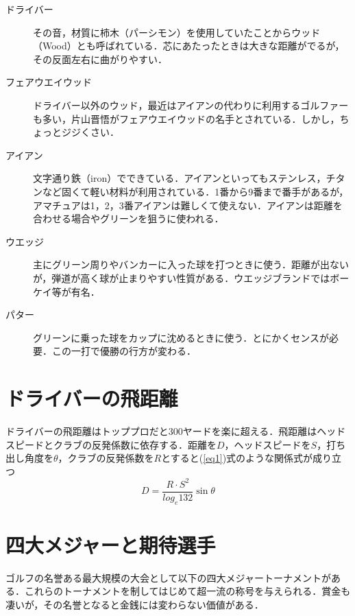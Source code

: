 \documentclass[a4j, twocolumn]{jarticle}
\begin{document}
\begin{description}
    \item[ドライバー]
    その音，材質に柿木（パーシモン）を使用していたことからウッド（Wood）とも呼ばれている．芯にあたったときは大きな距離がでるが，その反面左右に曲がりやすい．

    \item[フェアウエイウッド]
    ドライバー以外のウッド，最近はアイアンの代わりに利用するゴルファーも多い，片山晋悟がフェアウエイウッドの名手とされている．しかし，ちょっとジジくさい．

    \item[アイアン]
    文字通り鉄（iron）でできている．アイアンといってもステンレス，チタンなど固くて軽い材料が利用されている．1番から9番まで番手があるが，アマチュアは1，2，3番アイアンは難しくて使えない．アイアンは距離を合わせる場合やグリーンを狙うに使われる．

    \item[ウエッジ]
    主にグリーン周りやバンカーに入った球を打つときに使う．距離が出ないが，弾道が高く球が止まりやすい性質がある．ウエッジブランドではボーケイ等が有名．

    \item[パター]
    グリーンに乗った球をカップに沈めるときに使う．とにかくセンスが必要．この一打で優勝の行方が変わる．
\end{description}


\section{ドライバーの飛距離}

ドライバーの飛距離はトッププロだと300ヤードを楽に超える．飛距離はヘッドスピードとクラブの反発係数に依存する．距離を$D$，ヘッドスピードを$S$，打ち出し角度を$\theta$，クラブの反発係数を$R$とすると(\ref{eq1})式のような関係式が成り立つ~\cite{bib2}\\

\begin{equation}
    \label{eq1}
    D = \frac{R \cdot S^2}{log_e 132}\sin\theta
\end{equation}


\section{四大メジャーと期待選手}

ゴルフの名誉ある最大規模の大会として以下の四大メジャートーナメントがある．これらのトーナメントを制してはじめて超一流の称号を与えられる．賞金も凄いが，その名誉となると金銭には変わらない価値がある．\\
\end{document}
